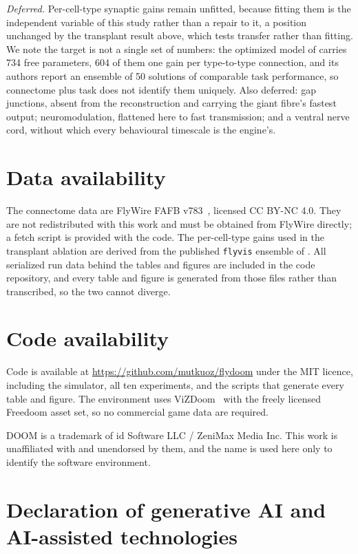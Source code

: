 \documentclass[10pt,twoside]{article}
\begin{document}
\emph{Deferred.} Per-cell-type synaptic gains remain unfitted, because fitting
them is the independent variable of this study rather than a repair to it, a
position unchanged by the transplant result above, which tests transfer rather
than fitting. We note the target is not a single set of
numbers: the optimized model of \citet{lappalainen2024} carries 734 free
parameters, 604 of them one gain per type-to-type connection, and its authors
report an ensemble of 50 solutions of comparable task performance, so
connectome plus task does not identify them uniquely. Also deferred: gap
junctions, absent from the reconstruction and carrying the giant fibre's
fastest output; neuromodulation, flattened here to fast transmission; and a
ventral nerve cord, without which every behavioural timescale is the engine's.

\section*{Data availability}

The connectome data are FlyWire FAFB v783~\citep{dorkenwald2024,schlegel2024},
licensed CC BY-NC 4.0. They are not redistributed with this work and must be
obtained from FlyWire directly; a fetch script is provided with the code. The
per-cell-type gains used in the transplant ablation are derived from the
published \texttt{flyvis} ensemble of \citet{lappalainen2024}. All serialized
run data behind the tables and figures are included in the code repository, and
every table and figure is generated from those files rather than transcribed,
so the two cannot diverge.

\section*{Code availability}

Code is available at \url{https://github.com/mutkuoz/flydoom} under the MIT
licence, including the simulator, all ten experiments, and the scripts that
generate every table and figure. The environment uses
ViZDoom~\citep{kempka2016} with the freely licensed Freedoom asset set, so no
commercial game data are required.

DOOM is a trademark of id Software LLC / ZeniMax Media Inc. This work is
unaffiliated with and unendorsed by them, and the name is used here only to
identify the software environment.

\section*{Declaration of generative AI and AI-assisted technologies}
\end{document}
